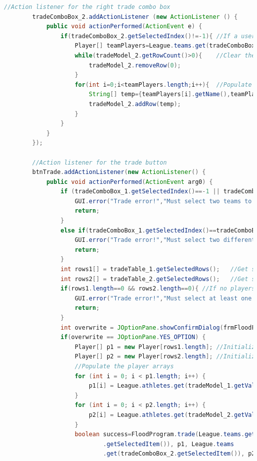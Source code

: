 \documentclass[12pt]{report}
\begin{document}
\begin{singlespace}
\begin{lstlisting}[language=Java,label=some-code,caption={GUI.java}]
		//Action listener for the right trade combo box
		tradeComboBox_2.addActionListener (new ActionListener () {
		    public void actionPerformed(ActionEvent e) {
		    	if(tradeComboBox_2.getSelectedIndex()!=-1){	//If a user is selected
			    	Player[] teamPlayers=League.teams.get(tradeComboBox_2.getSelectedItem()).getPlayers();	//Get the players the user has
			    	while(tradeModel_2.getRowCount()>0){	//Clear the current table
			    		tradeModel_2.removeRow(0);
			    	}
			    	for(int i=0;i<teamPlayers.length;i++){	//Populate the table with the new data
			    		String[] temp={teamPlayers[i].getName(),teamPlayers[i].getPosition(),Float.toString(teamPlayers[i].getPoints())};	//Initialize the row
			    		tradeModel_2.addRow(temp);
			    	}
		    	}
		    }
		});
		
		//Action listener for the trade button
		btnTrade.addActionListener(new ActionListener() {
			public void actionPerformed(ActionEvent arg0) {
				if (tradeComboBox_1.getSelectedIndex()==-1 || tradeComboBox_2.getSelectedIndex()==-1) {	//If either combo box doesn't have a user selected
					GUI.error("Trade error!","Must select two teams to trade between.");
					return;
				}
				else if(tradeComboBox_1.getSelectedIndex()==tradeComboBox_2.getSelectedIndex()){	//If the same user is selected in each combo box
					GUI.error("Trade error!","Must select two different teams to trade between.");
					return;
				}
				int rows1[] = tradeTable_1.getSelectedRows();	//Get selected rows in the left table
				int rows2[] = tradeTable_2.getSelectedRows();	//Get selected rows in the right table
				if(rows1.length==0 && rows2.length==0){	//If no players are selected
					GUI.error("Trade error!","Must select at least one player to trade.");
					return;
				}
				int overwrite = JOptionPane.showConfirmDialog(frmFloodFantasyLeague, "Are you sure you want to trade?");
                if(overwrite == JOptionPane.YES_OPTION) {
					Player[] p1 = new Player[rows1.length];	//Initialize player array for the left table selection
					Player[] p2 = new Player[rows2.length];	//Initialize player array for the right table selection
					//Populate the player arrays
					for (int i = 0; i < p1.length; i++) {
						p1[i] = League.athletes.get(tradeModel_1.getValueAt(rows1[i],0));
					}
					for (int i = 0; i < p2.length; i++) {
						p2[i] = League.athletes.get(tradeModel_2.getValueAt(rows2[i],0));
					}
					boolean success=FloodProgram.trade(League.teams.get(tradeComboBox_1	//Determine if it's a successful trade
							.getSelectedItem()), p1, League.teams
							.get(tradeComboBox_2.getSelectedItem()), p2);

\end{lstlisting}
\end{singlespace}
\end{document}
